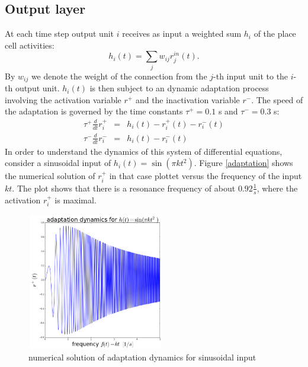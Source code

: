 \documentclass[a4paper, 12pt]{article}
\begin{document}
\subsection{Output layer}
At each time step output unit $i$ receives as input a weighted sum $h_i$ of the place cell activities: 
	\begin{equation}
	h_i(t)=\sum_jw_{ij}r_j^{in}(t).
	\end{equation}
By $w_{ij}$ we denote the weight of the connection from the $j$-th input unit to the $i$-th output unit. $h_i(t)$ is then subject to an dynamic adaptation process involving the activation variable $r^+$ and the inactivation variable $r^-$. The speed of the adaptation is governed by the time constants $\tau^+=0.1$ s and $\tau^-=0.3$ s:
	\begin{eqnarray}
	\tau^+\frac{d}{dt}r^+_i &=& h_i(t)-r^+_i(t)-r^-_i(t)\\
	\tau^-\frac{d}{dt}r^-_i &=& h_i(t)-r^-_i(t)
	\end{eqnarray}
In order to understand the dynamics of this system of differential equations, consider a sinusoidal input of $h_i(t) = \sin(\pi k t^2)$. Figure \ref{adaptation} shows the numerical solution of $r^+_i$ in that case plottet versus the frequency of the input $kt$. The plot shows that there is a resonance frequency of about $0.92 \frac{1}{s}$, where the activation $r^+_i$ is maximal.
\begin{figure}[h]
	\begin{center}
	\includegraphics[width=6cm, height=6cm]{pics/sinusoidal_activation}
	\footnotesize{\caption{numerical solution of adaptation dynamics for sinusoidal input}}
	\end{center}
\end{figure}
\end{document}
